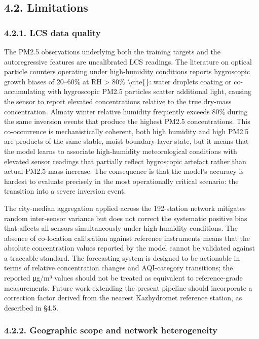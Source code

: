 \subsection{4.2. Limitations}\label{limitations}

\subsubsection{4.2.1. LCS data quality}\label{lcs-data-quality}

The PM2.5 observations underlying both the training targets and the autoregressive features are uncalibrated LCS readings. The literature on optical particle counters operating under high-humidity conditions reports hygroscopic growth biases of 20--60\% at RH \textgreater{} 80\% \textbackslash cite\{\cite{DiAntonio2018humidity, Kosmopoulos2020}\}: water droplets coating or co-accumulating with hygroscopic PM2.5 particles scatter additional light, causing the sensor to report elevated concentrations relative to the true dry-mass concentration. Almaty winter relative humidity frequently exceeds 80\% during the same inversion events that produce the highest PM2.5 concentrations. This co-occurrence is mechanistically coherent, both high humidity and high PM2.5 are products of the same stable, moist boundary-layer state, but it means that the model learns to associate high-humidity meteorological conditions with elevated sensor readings that partially reflect hygroscopic artefact rather than actual PM2.5 mass increase. The consequence is that the model's accuracy is hardest to evaluate precisely in the most operationally critical scenario: the transition into a severe inversion event.

The city-median aggregation applied across the 192-station network mitigates random inter-sensor variance but does not correct the systematic positive bias that affects all sensors simultaneously under high-humidity conditions. The absence of co-location calibration against reference instruments means that the absolute concentration values reported by the model cannot be validated against a traceable standard. The forecasting system is designed to be actionable in terms of relative concentration changes and AQI-category transitions; the reported μg/m³ values should not be treated as equivalent to reference-grade measurements. Future work extending the present pipeline should incorporate a correction factor derived from the nearest Kazhydromet reference station, as described in §4.5.

\subsubsection{4.2.2. Geographic scope and network heterogeneity}\label{geographic-scope-and-network-heterogeneity}

